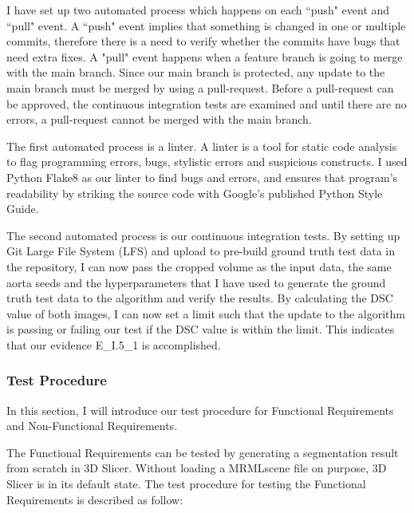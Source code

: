 I have set up two automated process which happens on each ``push" event and ``pull" event. A ``push" event implies that something is changed in one or multiple commits, therefore there is a need to verify whether the commits have bugs that need extra fixes. A "pull" event happens when a feature branch is going to merge with the main branch. Since our main branch is protected, any update to the main branch must be merged by using a pull-request. Before a pull-request can be approved, the continuous integration tests are examined and until there are no errors, a pull-request cannot be merged with the main branch. 

The first automated process is a linter. A linter is a tool for static code analysis to flag programming errors, bugs, stylistic errors and suspicious constructs. I used Python Flake8 as our linter to find bugs and errors, and ensures that program's readability by striking the source code with Google's published  Python Style Guide. \cite{Linter}

The second automated process is our continuous integration tests. By setting up Git Large File System (LFS) and upload to pre-build ground truth test data in the repository, I can now pass the cropped volume as the input data, the same aorta seeds and the hyperparameters that I have used to generate the ground truth test data to the algorithm and verify the results. By calculating the DSC value of both images, I can now set a limit such that the update to the algorithm is passing or failing our test if  the DSC value is within the limit. This indicates that our evidence E\_I.5\_1 is accomplished.

\subsubsection{Test Procedure}

In this section, I will introduce our test procedure for Functional Requirements and Non-Functional Requirements.

The Functional Requirements can be tested by generating a segmentation result from scratch in 3D Slicer. Without loading a MRMLscene file on purpose, 3D Slicer is in its default state. The test procedure for testing the Functional Requirements is described as follow:

